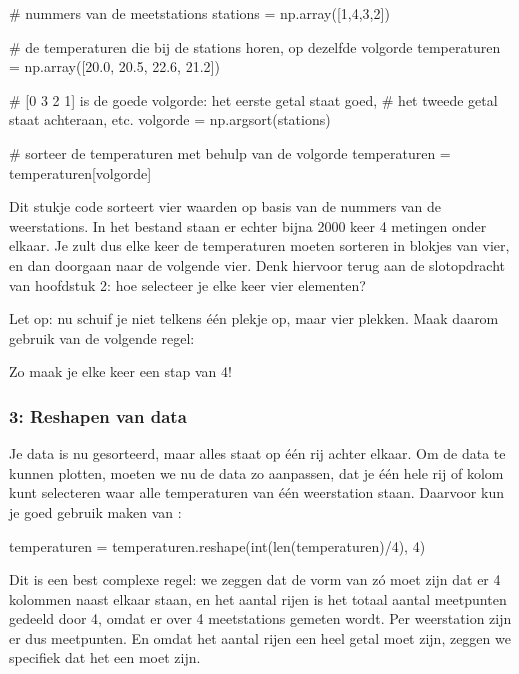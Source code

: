 \documentclass[a4paper,11pt, fleqn]{article}
\begin{document}
\begin{python}
# nummers van de meetstations
stations = np.array([1,4,3,2])

# de temperaturen die bij de stations horen, op dezelfde volgorde
temperaturen = np.array([20.0, 20.5, 22.6, 21.2])

# [0 3 2 1] is de goede volgorde: het eerste getal staat goed,
# het tweede getal staat achteraan, etc.
volgorde = np.argsort(stations)

# sorteer de temperaturen met behulp van de volgorde
temperaturen = temperaturen[volgorde]
\end{python}

Dit stukje code sorteert vier waarden op basis van de nummers van de weerstations. In het bestand staan er echter bijna 2000 keer 4 metingen onder elkaar. Je zult dus elke keer de temperaturen moeten sorteren in blokjes van vier, en dan doorgaan naar de volgende vier. Denk hiervoor terug aan de slotopdracht van hoofdstuk 2: hoe selecteer je elke keer vier elementen? 

Let op: nu schuif je niet telkens één plekje op, maar vier plekken. Maak daarom gebruik van de volgende regel:


Zo maak je elke keer een stap van 4!

\subsubsection*{3: Reshapen van data}
Je data is nu gesorteerd, maar alles staat op \'e\'en rij achter elkaar. Om de data te kunnen plotten, moeten we nu de data zo aanpassen, dat je \'e\'en hele rij of kolom kunt selecteren waar alle temperaturen van \'e\'en weerstation staan. Daarvoor kun je goed gebruik maken van :

\begin{python}
temperaturen = temperaturen.reshape(int(len(temperaturen)/4), 4)
\end{python}

Dit is een best complexe regel: we zeggen dat de vorm van  z\'o moet zijn dat er 4 kolommen naast elkaar staan, en het aantal rijen is het totaal aantal meetpunten gedeeld door 4, omdat er over 4 meetstations gemeten wordt. Per weerstation zijn er dus  meetpunten. En omdat het aantal rijen een heel getal moet zijn, zeggen we specifiek dat het een  moet zijn.
\end{document}
